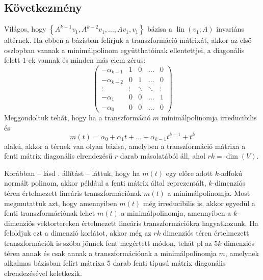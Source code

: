\documentclass[a4paper, showtrims]{memoir}
\theoremstyle{plain}
\theoremstyle{remark}
\theoremstyle{definition}
\DeclareMathOperator{\lin}{lin}
\begin{document}
\subsection{Következmény}
Világos, hogy
\(
\left\{
A^{k-1}v_1, A^{k-2}v_1,\ldots,Av_1,v_1
\right\}
\)
bázisa a $\lin( v_1;A)$
invariáns altérnek.
Ha ebben a bázisban felírjuk a transzformáció mátrixát,
akkor az első oszlopban vannak a minimálpolinom együtthatóinak ellentettjei,
a diagonális felett $1$-ek vannak és minden más elem zérus:
\[
	\begin{pmatrix}
		-\alpha_{k-1} & 1      & 0      & \dots  & 0      \\
		-\alpha_{k-2} & 0      & 1      & \dots  & 0      \\
		\vdots        & \vdots & \ddots & \ddots & \vdots \\
		-\alpha_{1}   & 0      & 0      & \dots  & 1      \\
		-\alpha_{0}   & 0      & 0      & \dots  & 0
	\end{pmatrix}
\]
Meggondoltuk tehát, hogy ha a transzformáció $m$ minimálpolinomja irreducibilis és
\[m\left( t \right)
	=\alpha_0+\alpha_1t+\dots+\alpha_{k-1}t^{k-1}+t^k
\]
alakú, akkor a térnek van olyan bázisa, amelyben a transzformáció mátrixa a fenti mátrix
diagonális elrendezésű $r$ darab másolatából áll, ahol $rk=\dim(V)$.

Korábban -- lásd . állítást -- láttuk, 
hogy ha $m\left( t \right)$ egy előre adott $k$-adfokú normált polinom,
akkor például a fenti mátrix által reprezentált,
$k$-dimenziós téren értelmezett lineáris transzformációnak $m\left( t \right)$
a minimálpolinomja. 
Most megmutattuk azt, hogy amennyiben $m\left( t \right)$ még irreducibilis is, 
akkor egyedül a fenti transzformációnak lehet $m\left( t \right)$ a minimálpolinomja,
amennyiben a $k$-dimenziós vektortereken értelmezett lineáris transzformációkra hagyatkozunk.
Ha feloldjuk ezt a dimenzió korlátot, akkor még az $rk$ dimenziós téren értelmezett transzformációk is szóba jönnek
fent megértett módon, tehát pl az $5k$ dimenziós téren annak és csak annak a transzformációnak a minimálpolinomja $m$,
amelynek alkalmas bázisban felírt mátrixa 5 darab fenti típusú mátrix diagonális elrendezésével keletkezik.

\end{document}
